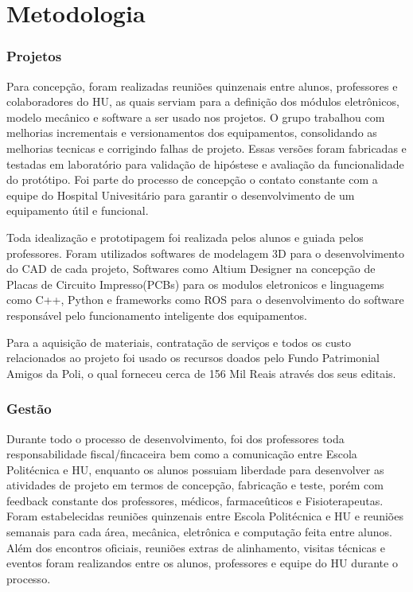 \documentclass[../poliXuniversity_hospital_(USP)_report.tex]{subfiles}
\begin{document}
\chapter{Metodologia}

\subsection{Projetos}

Para concepção, foram realizadas reuniões quinzenais entre alunos, professores e colaboradores do HU, as quais serviam para a definição dos módulos eletrônicos, modelo mecânico e software a ser usado nos projetos. O grupo trabalhou com melhorias incrementais e versionamentos dos equipamentos, consolidando as melhorias tecnicas e corrigindo falhas de projeto. Essas versões foram fabricadas e testadas em laboratório para validação de hipóstese e avaliação da funcionalidade do protótipo. Foi parte do processo de concepção o contato constante com a equipe do Hospital Univesitário para garantir o desenvolvimento de um equipamento útil e funcional.

Toda idealização e prototipagem foi realizada pelos alunos e guiada pelos professores. Foram utilizados softwares de modelagem 3D para o desenvolvimento do CAD de cada projeto, Softwares como Altium Designer \cite{altium21} na concepção de Placas de Circuito Impresso(PCBs) para os modulos eletronicos e linguagems como C++\cite{c++21}, Python\cite{python21} e frameworks como ROS\cite{ROS21} para o desenvolvimento do software responsável pelo funcionamento inteligente dos equipamentos.

Para a aquisição de materiais, contratação de serviços e todos os custo relacionados ao projeto foi usado os recursos doados pelo Fundo Patrimonial Amigos da Poli\cite{ADP}, o qual forneceu cerca de 156 Mil Reais através dos seus editais. 

\subsection{Gestão}

Durante todo o processo de desenvolvimento, foi dos professores toda responsabilidade fiscal/fincaceira bem como a comunicação entre Escola Politécnica e HU, enquanto os alunos possuiam liberdade para desenvolver as atividades de projeto em termos de concepção, fabricação e teste, porém com feedback constante dos professores, médicos, farmaceûticos e Fisioterapeutas. Foram estabelecidas reuniões quinzenais entre Escola Politécnica e HU e reuniões semanais para cada área, mecânica, eletrônica e computação feita entre alunos. Além dos encontros oficiais, reuniões extras de alinhamento, visitas técnicas e eventos foram realizandos entre os alunos, professores e equipe do HU durante o processo.
\end{document}
